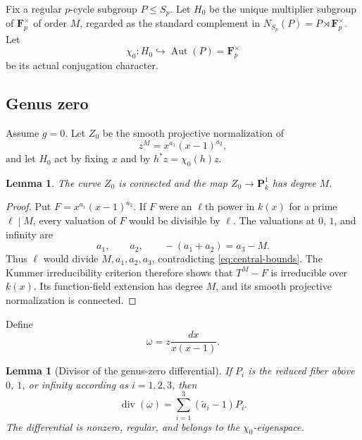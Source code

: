 \documentclass[10pt,a4paper]{amsart}
\newtheorem{lemma}[theorem]{Lemma}
\numberwithin{equation}{section}
\begin{document}
Fix a regular $p$-cycle subgroup $P\leq S_p$.  Let $H_0$ be the unique
multiplier subgroup of $\mathbf F_p^\times$ of order $M$, regarded as the
standard complement in
$N_{S_p}(P)=P\rtimes\mathbf F_p^\times$.  Let
\[
 \chi_0:H_0\hookrightarrow\operatorname{Aut}(P)=\mathbf F_p^\times
\]
be its actual conjugation character.

\subsection{Genus zero}
Assume $g=0$.  Let $Z_0$ be the smooth projective normalization of
\begin{equation}\label{eq:genus-zero-kummer}
 z^M=x^{a_1}(x-1)^{a_2},
\end{equation}
and let $H_0$ act by fixing $x$ and by
$h^*z=\chi_0(h)z$.

\begin{lemma}\label{lem:genus-zero-connected}
The curve $Z_0$ is connected and the map $Z_0\to\mathbf P^1_k$ has degree
$M$.
\end{lemma}

\begin{proof}
Put $F=x^{a_1}(x-1)^{a_2}$.  If $F$ were an $\ell$th power in $k(x)$ for a
prime $\ell\mid M$, every valuation of $F$ would be divisible by $\ell$.
The valuations at $0$, $1$, and infinity are
\[
 a_1,\qquad a_2,\qquad -(a_1+a_2)=a_3-M.
\]
Thus $\ell$ would divide $M,a_1,a_2,a_3$, contradicting
\eqref{eq:central-bounds}.  The Kummer irreducibility criterion therefore
shows that $T^M-F$ is irreducible over $k(x)$.  Its function-field extension
has degree $M$, and its smooth projective normalization is connected.
\end{proof}

Define
\begin{equation}\label{eq:genus-zero-form}
 \omega=z\frac{dx}{x(x-1)}.
\end{equation}

\begin{lemma}[Divisor of the genus-zero differential]
\label{lem:genus-zero-divisor}
If $P_i$ is the reduced fiber above $0$, $1$, or infinity according as
$i=1,2,3$, then
\[
 \operatorname{div}(\omega)
 =\sum_{i=1}^3(\widetilde a_i-1)P_i.
 \label{eq:genus-zero-divisor}
\]
The differential is nonzero, regular, and belongs to the
$\chi_0$-eigenspace.
\end{lemma}
\end{document}
